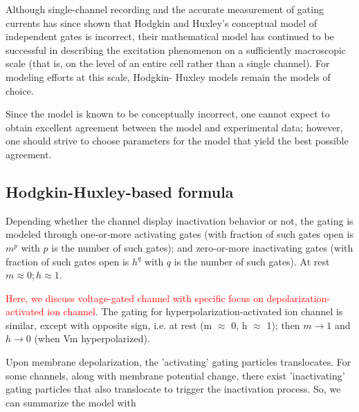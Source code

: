 \begin{mdframed}
Although single-channel recording and the accurate measurement of gating
currents has since shown that Hodgkin and Huxley's conceptual model of
independent gates is incorrect, their mathematical model has continued to be
successful in describing the excitation phenomenon on a sufficiently macroscopic
scale (that is, on the level of an entire cell rather than a single channel).
For modeling efforts at this scale, Hodgkin- Huxley models remain the models of
choice.

Since the model is known to be conceptually incorrect, one cannot expect to
obtain excellent agreement between the model and experimental data; however, one
should strive to choose parameters for the model that yield the best possible
agreement.

\end{mdframed}


\subsection{Hodgkin-Huxley-based formula}
\label{sec:Hodgkin-Huxley-formula}


Depending whether the channel display inactivation behavior or not, the gating
is modeled through one-or-more activating gates (with fraction of such
gates open is $m^p$ with $p$ is the number of such gates); and zero-or-more
inactivating gates (with fraction of such gates open is $h^q$ with $q$ is the
number of such gates). At rest $m \approx 0; h\approx 1$.

\textcolor{red}{Here, we discuss voltage-gated channel with specific focus
on depolarization-activated ion channel}. The gating for
hyperpolarization-activated ion channel is similar, except with opposite sign,
i.e. at rest (m $\approx$ 0, h $\approx$ 1); then $m \rightarrow 1$ and $h
\rightarrow 0$ (when Vm hyperpolarized).

Upon membrane depolarization, the 'activating' gating particles translocates.
For some channels, along with membrane potential change, there exist
'inactivating' gating particles that also translocate to trigger the
inactivation process. So, we can summarize the model with

